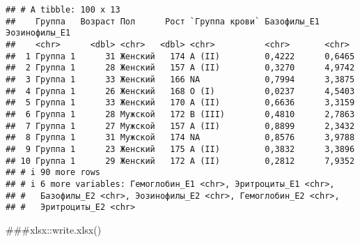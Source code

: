 \documentclass[
]{article}
\begin{document}
\begin{verbatim}
## # A tibble: 100 x 13
##    Группа   Возраст Пол      Рост `Группа крови` Базофилы_E1 Эозинофилы_E1
##    <chr>      <dbl> <chr>   <dbl> <chr>          <chr>       <chr>        
##  1 Группа 1      31 Женский   174 A (II)         0,4222      0,6465       
##  2 Группа 1      28 Женский   157 A (II)         0,3270      4,9742       
##  3 Группа 1      33 Женский   166 NA             0,7994      3,3875       
##  4 Группа 1      26 Женский   168 O (I)          0,0237      4,5403       
##  5 Группа 1      33 Женский   170 A (II)         0,6636      3,3159       
##  6 Группа 1      28 Мужской   172 B (III)        0,4810      2,7863       
##  7 Группа 1      27 Мужской   157 A (II)         0,8899      2,3432       
##  8 Группа 1      31 Мужской   174 NA             0,8576      3,9788       
##  9 Группа 1      23 Женский   175 A (II)         0,3832      3,3896       
## 10 Группа 1      29 Женский   172 A (II)         0,2812      7,9352       
## # i 90 more rows
## # i 6 more variables: Гемоглобин_E1 <chr>, Эритроциты_E1 <chr>,
## #   Базофилы_E2 <chr>, Эозинофилы_E2 <chr>, Гемоглобин_E2 <chr>,
## #   Эритроциты_E2 <chr>
\end{verbatim}

\#\#\#xlsx::write.xlsx()
\end{document}

